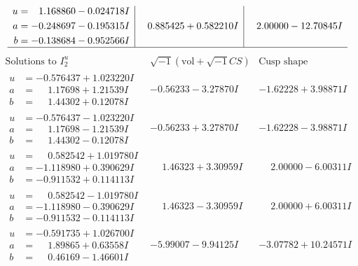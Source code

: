 \documentclass[1p]{elsarticle_modified}
\theoremstyle{definition}
\newcommand{\I}{\sqrt{-1}}
\begin{document}
$$\begin{array}{c|c|c}
\begin{aligned}
u &= \phantom{-}1.168860 - 0.024718 I \\
a &= -0.248697 - 0.195315 I \\
b &= -0.138684 - 0.952566 I\end{aligned}
 & \phantom{-}0.885425 + 0.582210 I & \phantom{-}2.00000 - 12.70845 I\\
 \hline 
 \end{array}$$\newpage$$\begin{array}{c|c|c}  
\text{Solutions to }I^u_{2}& \I (\text{vol} + \sqrt{-1}CS) & \text{Cusp shape}\\
 \hline 
\begin{aligned}
u &= -0.576437 + 1.023220 I \\
a &= \phantom{-}1.17698 + 1.21539 I \\
b &= \phantom{-}1.44302 + 0.12078 I\end{aligned}
 & -0.56233 - 3.27870 I & -1.62228 + 3.98871 I \\ \hline\begin{aligned}
u &= -0.576437 - 1.023220 I \\
a &= \phantom{-}1.17698 - 1.21539 I \\
b &= \phantom{-}1.44302 - 0.12078 I\end{aligned}
 & -0.56233 + 3.27870 I & -1.62228 - 3.98871 I \\ \hline\begin{aligned}
u &= \phantom{-}0.582542 + 1.019780 I \\
a &= -1.118980 + 0.390629 I \\
b &= -0.911532 + 0.114113 I\end{aligned}
 & \phantom{-}1.46323 + 3.30959 I & \phantom{-}2.00000 - 6.00311 I \\ \hline\begin{aligned}
u &= \phantom{-}0.582542 - 1.019780 I \\
a &= -1.118980 - 0.390629 I \\
b &= -0.911532 - 0.114113 I\end{aligned}
 & \phantom{-}1.46323 - 3.30959 I & \phantom{-}2.00000 + 6.00311 I \\ \hline\begin{aligned}
u &= -0.591735 + 1.026700 I \\
a &= \phantom{-}1.89865 + 0.63558 I \\
b &= \phantom{-}0.46169 - 1.46601 I\end{aligned}
 & -5.99007 - 9.94125 I & -3.07782 + 10.24571 I \\ \hline\begin{aligned}

\end{aligned}
\end{array}$$
\end{document}
